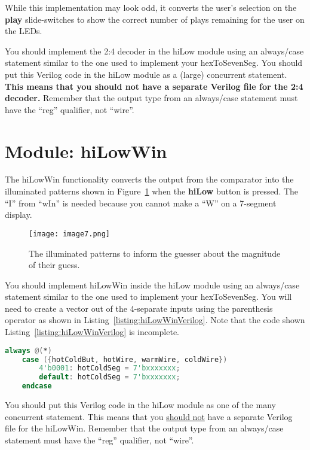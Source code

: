 While this implementation may look odd, it converts the user's selection
on the \textbf{play} slide-switches to show the correct number of plays
remaining for the user on the LEDs.

You should implement the 2:4 decoder in the hiLow module using an
always/case statement similar to the one used to implement your
hexToSevenSeg. You should put this Verilog code in the hiLow module as a
(large) concurrent statement. \textbf{This means that you should not
have a separate Verilog file for the 2:4 decoder.} Remember that the
output type from an always/case statement must have the ``reg''
qualifier, not ``wire''.

\section{Module: hiLowWin}

The hiLowWin functionality converts the output from the comparator into
the illuminated patterns shown in Figure~\ref{fig:hiLowWinDisplay}
when the \textbf{hiLow}
button is pressed. The ``I'' from ``wIn'' is needed because you cannot
make a ``W'' on a 7-segment display.

\begin{figure}[ht]
    \texttt{[image: image7.png]}
    \caption{The illuminated patterns to inform the guesser about the
    magnitude of their guess.}
    \label{fig:hiLowWinDisplay}
\end{figure}

You should implement hiLowWin inside the hiLow module using an
always/case statement similar to the one used to implement your
hexToSevenSeg. You will need to create a vector out of the 4-separate
inputs using the parenthesis operator as shown in Listing~\ref{listing:hiLowWinVerilog}.
Note that the code shown Listing~\ref{listing:hiLowWinVerilog} is incomplete.

\begin{lstlisting}[language=Verilog,
 caption={Starter code for the hiLowWin module.},
 label={listing:hiLowWinVerilog},
 frame=single]
 always @(*)
    case ({hotColdBut, hotWire, warmWire, coldWire})
        4'b0001: hotColdSeg = 7'bxxxxxxx;
        default: hotColdSeg = 7'bxxxxxxx;
    endcase
 \end{lstlisting}

You should put this Verilog code in the hiLow module as one of the many
concurrent statement. This means that you \uline{should not} have a
separate Verilog file for the hiLowWin. Remember that the output type
from an always/case statement must have the ``reg'' qualifier, not
``wire''.

